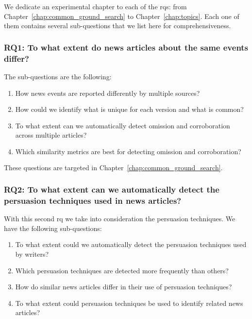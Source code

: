 We dedicate an experimental chapter to each of the \acrlong{rq}s: from Chapter~\ref{chap:common_ground_search} to Chapter~\ref{chap:topics}.
Each one of them contains several sub-questions that we list here for comprehensiveness.


\subsubsection*{RQ1: To what extent do news articles about the same events differ?}

The sub-questions are the following:
\begin{enumerate}[label={\textbf{RQ1.\arabic*:}},leftmargin=2cm]
    \item How news events are reported differently by multiple sources?
    \item How could we identify what is unique for each version and what is common? 
    \item To what extent can we automatically detect omission and corroboration across multiple articles?
    \item Which similarity metrics are best for detecting omission and corroboration?
\end{enumerate}

These questions are targeted in Chapter~\ref{chap:common_ground_search}.

\subsubsection*{RQ2: To what extent can we automatically detect the persuasion techniques used in news articles?}

With this second \acrlong{rq} we take into consideration the persuasion techniques. We have the following sub-questions:

\begin{enumerate}[label={\textbf{RQ2.\arabic*:}},leftmargin=2cm]
    \item To what extent could we automatically detect the persuasion techniques used by writers?
    \item Which persuasion techniques are detected more frequently than others?
    \item How do similar news articles differ in their use of persuasion techniques?
    \item To what extent could persuasion techniques be used to identify related news articles?
\end{enumerate}

